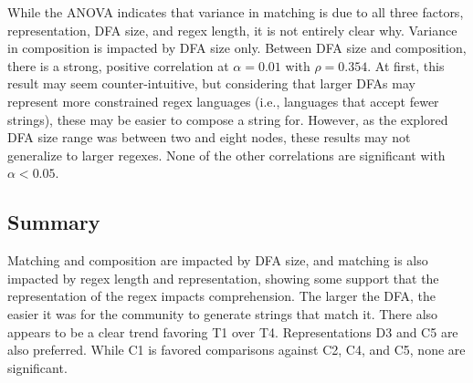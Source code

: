 While the ANOVA indicates that variance in matching is due to all three factors, representation, DFA size, and regex length, it is not entirely clear why. Variance in composition is impacted by DFA size only. 
Between DFA size and composition, there is a strong, positive correlation at $\alpha = 0.01$ with $\rho = 0.354$. 
At first, this result may seem counter-intuitive, but considering that larger DFAs may represent more constrained regex languages (i.e., languages that accept fewer strings), these may be easier to compose a string for. 
However, as the explored DFA size range was between two and eight nodes, these results may not generalize to larger regexes. 
None of the other correlations are significant with $\alpha < 0.05$.  %



\subsection{Summary}
Matching and composition are impacted by DFA size, and matching is also impacted by regex length and representation, showing some support that the representation of the regex impacts comprehension.
The larger the DFA, the easier it was for the community to generate strings that match it. 
There also appears to be a clear trend favoring T1 over T4. Representations D3 and C5 are also preferred. While C1 is favored  comparisons against C2, C4, and C5, none are significant. 



